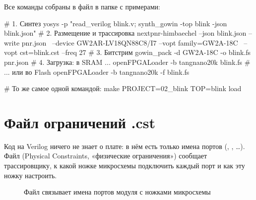 Все команды собраны в файл  в папке с примерами:
\begin{vcode}[bash]
# 1. Синтез
yosys -p "read_verilog blink.v; synth_gowin -top blink -json blink.json"
# 2. Размещение и трассировка
nextpnr-himbaechel --json blink.json --write pnr.json \
    --device GW2AR-LV18QN88C8/I7 --vopt family=GW2A-18C \
    --vopt cst=blink.cst --freq 27
# 3. Битстрим
gowin_pack -d GW2A-18C -o blink.fs pnr.json
# 4. Загрузка: в SRAM ...
openFPGALoader -b tangnano20k blink.fs
# ... или во Flash
openFPGALoader -b tangnano20k -f blink.fs

# То же самое одной командой:
make PROJECT=02_blink TOP=blink load
\end{vcode}

\section{Файл ограничений .cst}
\label{sec:cst}

Код на Verilog ничего не знает о плате: в нём есть только имена портов
(, , \ldots). Файл  (Physical
Constraints, «физические ограничения») сообщает трассировщику, к какой ножке
микросхемы подключить каждый порт и как эту ножку настроить.

\begin{figure}[H]
\centering
{}
\caption{Файл  связывает имена портов модуля с ножками микросхемы}
\end{figure}


